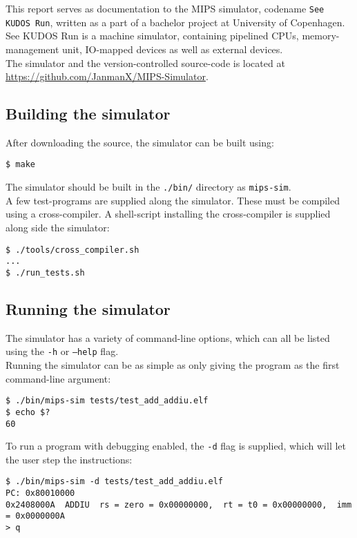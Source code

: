 This report serves as documentation to the MIPS simulator, codename
\texttt{See KUDOS Run}, written as a part of a bachelor project at University
of Copenhagen. See KUDOS Run is a machine simulator, containing pipelined CPUs,
memory-management unit, IO-mapped devices as well as external devices.\\
The simulator and the version-controlled source-code is located at \url{https://github.com/JanmanX/MIPS-Simulator}.
\subsection*{Building the simulator}
After downloading the source, the simulator can be built using:
\begin{verbatim}
$ make
\end{verbatim}
The simulator should be built in the \texttt{./bin/} directory as \texttt{mips-sim}.\\
A few test-programs are supplied along the simulator. These must be compiled
using a cross-compiler. A shell-script installing the cross-compiler is supplied
along side the simulator:
\begin{verbatim}
$ ./tools/cross_compiler.sh
...
$ ./run_tests.sh
\end{verbatim}
\subsection*{Running the simulator}
The simulator has a variety of command-line options, which can all be listed
using the \texttt{-h} or \texttt{--help} flag.\\
Running the simulator can be as simple as only giving the program as the first
command-line argument:
\begin{verbatim}
$ ./bin/mips-sim tests/test_add_addiu.elf
$ echo $?
60
\end{verbatim}
To run a program with debugging enabled, the \texttt{-d} flag is supplied, which
will let the user step the instructions:
\begin{verbatim}
$ ./bin/mips-sim -d tests/test_add_addiu.elf
PC: 0x80010000
0x2408000A	ADDIU  rs = zero = 0x00000000,  rt = t0 = 0x00000000,  imm = 0x0000000A
> q
\end{verbatim}
